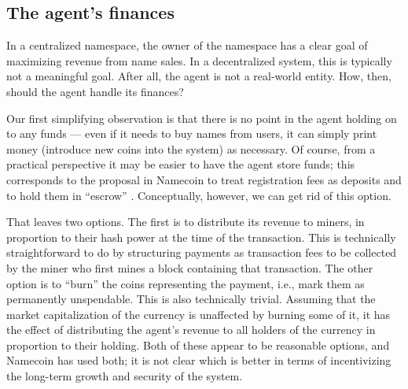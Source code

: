 \subsection{The agent's finances}
In a centralized namespace, the owner of the namespace has a clear goal of maximizing revenue from name sales. In a decentralized system, this is typically not a meaningful goal. After all, the agent is not a real-world entity.  How, then, should the agent handle its finances? 

Our first simplifying observation is that there is no point in the agent holding on to any funds --- even if it needs to buy names from users, it can simply print money (introduce new coins into the system) as necessary. Of course, from a practical perspective it may be easier to have the agent store funds; this corresponds to the proposal in Namecoin to treat registration fees as deposits and to hold them in ``escrow'' \cite{escrow}. Conceptually, however, we can get rid of this option.

That leaves two options. The first is to distribute its revenue to miners, in proportion to their hash power at the time of the transaction. This is technically straightforward to do by structuring payments as transaction fees to be collected by the miner who first mines a block containing that transaction. The other option is to ``burn'' the coins representing the payment, i.e., mark them as permanently unspendable. This is also technically trivial. Assuming that the market capitalization of the currency is unaffected by burning some of it, it has the effect of distributing the agent's revenue to all holders of the currency in proportion to their holding. Both of these appear to be reasonable options, and Namecoin has used both; it is not clear which is better in terms of incentivizing the long-term growth and security of the system.


